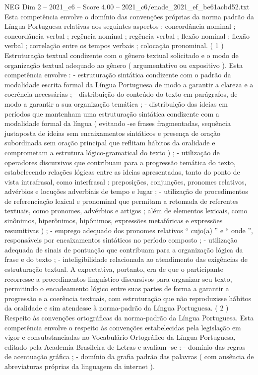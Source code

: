 \begin{textsample}{NEG Dim 2 – 2021\_c6 – Score 4.00 – 2021\_c6/enade\_2021\_ef\_be61acbd52.txt}
Esta competência envolve o domínio das convenções próprias da norma padrão da Língua Portuguesa relativas aos seguintes aspectos : concordância nominal ; concordância verbal ; regência nominal ; regência verbal ; flexão nominal ; flexão verbal ; correlação entre os tempos verbais ; colocação pronominal. ( 1 ) Estruturação textual condizente com o gênero textual solicitado e o modo de organização textual adequado ao gênero ( argumentativo ou expositivo ).
Esta competência envolve : - estruturação sintática condizente com o padrão da modalidade escrita formal da Língua Portuguesa de modo a garantir a clareza e a coerência necessárias ; - distribuição do conteúdo do texto em parágrafos, de modo a garantir a sua organização temática ; - distribuição das ideias em períodos que mantenham uma estruturação sintática condizente com a modalidade formal da língua ( evitando -se frases fragmentadas, sequência justaposta de ideias sem encaixamentos sintáticos e presença de oração subordinada sem oração principal que reflitam hábitos da oralidade e comprometam a estrutura lógico-gramatical do texto ) ; - utilização de operadores discursivos que contribuam para a progressão temática do texto, estabelecendo relações lógicas entre as ideias apresentadas, tanto do ponto de vista intrafrasal, como interfrasal : preposições, conjunções, pronomes relativos, advérbios e locuções adverbiais de tempo e lugar ; - utilização de procedimentos de referenciação lexical e pronominal que permitam a retomada de referentes textuais, como pronomes, advérbios e artigos ; além de elementos lexicais, como sinônimos, hiperônimos, hipônimos, expressões metafóricas e expressões resumitivas ) ; - emprego adequado dos pronomes relativos “ cujo(a) ” e “ onde ”, responsáveis por encaixamentos sintáticos no período composto ; - utilização adequada de sinais de pontuação que contribuam para a organização lógica da frase e do texto ; - inteligibilidade relacionada ao atendimento das exigências de estruturação textual.
A expectativa, portanto, era de que o participante recorresse a procedimentos linguístico-discursivos para organizar seu texto, permitindo o encadeamento lógico entre suas partes de forma a garantir a progressão e a coerência textuais, com estruturação que não reproduzisse hábitos da oralidade e sim atendesse à norma-padrão da Língua Portuguesa. ( 2 ) Respeito às convenções ortográficas da norma-padrão da Língua Portuguesa.
Esta competência envolve o respeito às convenções estabelecidas pela legislação em vigor e consubstanciadas no Vocabulário Ortográfico da Língua Portuguesa, editado pela Academia Brasileira de Letras e avaliam -se : - domínio das regras de acentuação gráfica ; - domínio da grafia padrão das palavras ( com ausência de abreviaturas próprias da linguagem da internet ).

\end{textsample}

